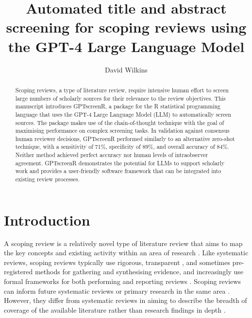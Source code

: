 \documentclass[10pt,a4paper,twocolumn]{article}
\begin{document}
\title{Automated title and abstract screening for scoping reviews using the GPT-4 Large Language Model}
\author[1]{David Wilkins}
\maketitle

\begin{abstract}
  Scoping reviews, a type of literature review, require intensive human effort to screen large numbers of scholarly sources for their relevance to the review objectives. This manuscript introduces GPTscreenR, a package for the R statistical programming language that uses the GPT-4 Large Language Model (LLM) to automatically screen sources. The package makes use of the chain-of-thought technique with the goal of maximising performance on complex screening tasks. In validation against consensus human reviewer decisions, GPTscreenR performed similarly to an alternative zero-shot technique, with a sensitivity of 71\%, specificity of 89\%, and overall accuracy of 84\%. Neither method achieved perfect accuracy nor human levels of intraobserver agreement. GPTscreenR demonstrates the potential for LLMs to support scholarly work and provides a user-friendly software framework that can be integrated into existing review processes.
\end{abstract}

\section{Introduction}

A scoping review is a relatively novel type of literature review that aims to map the key concepts and existing activity within an area of research \cite{Arksey.2005}. Like systematic reviews, scoping reviews typically use rigorous, transparent \cite{Pham.2014}, and sometimes pre-registered methods for gathering and synthesising evidence, and increasingly use formal frameworks for both performing and reporting reviews \cite{Peters.2021}. Scoping reviews can inform future systematic reviews or primary research in the same area \cite{Sutton.2019}. However, they differ from systematic reviews in aiming to describe the breadth of coverage of the available literature rather than research findings in depth \cite{Arksey.2005}.
\end{document}
